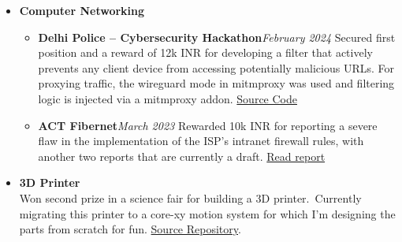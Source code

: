 \documentclass[11pt]{article}
\begin{document}
\begin{tblr}
\begin{itemize}[topsep=0pt,leftmargin=15pt]
            \item \textbf{Computer Networking}
            \begin{itemize}
                \item \textbf{Delhi Police -- Cybersecurity Hackathon}\hfill\textit{February 2024}\newline
                Secured first position and a reward of 12k INR for developing a filter that actively prevents any client
                device from accessing potentially malicious URLs. For proxying traffic, the wireguard mode in mitmproxy
                was used and filtering logic is injected via a mitmproxy addon.
                \href{https://github.com/sujaldev/cerberus}{\color{blue}Source Code}
                \item \textbf{ACT Fibernet}\hfill\textit{March 2023}\newline
                Rewarded 10k INR for reporting a severe flaw in the implementation of the ISP's intranet firewall rules,
                with another two reports that are currently a draft.
                \href{https://pdf.sujal.dev/act/report.pdf}{\color{blue} Read report}
            \end{itemize}


            \item \textbf{3D Printer}\\
            Won second prize in a science fair for building a 3D printer.\ Currently migrating this printer to a core-xy
            motion system for which I'm designing the parts from scratch for fun.
            \href{https://github.com/xserv-labs/cad}{\color{blue}Source Repository}.



\end{itemize}
\end{tblr}
\end{document}
